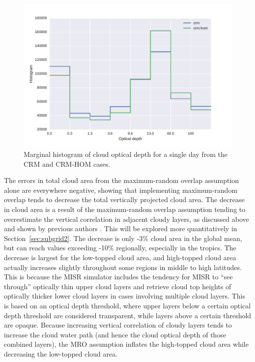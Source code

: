 \begin{figure}[htbp]
\centering
\includegraphics{graphics/taudist_hom.pdf}
\caption{\label{fig:subgrid1_cldtau_distribution}Marginal histogram of
cloud optical depth for a single day from the CRM and CRM-HOM
cases.}\label{fig:subgrid1ux5fcldtauux5fdistribution}
\end{figure}

The errors in total cloud area from the maximum-random overlap
assumption alone are everywhere negative, showing that implementing
maximum-random overlap tends to decrease the total vertically projected
cloud area. The decrease in cloud area is a result of the maximum-random
overlap assumption tending to overestimate the vertical correlation in
adjacent cloudy layers, as discussed above and shown by previous authors
\citep{mace_and_benson-troth_2002, hogan_and_illingworth_2000, barker_2008}.
This will be explored more quantitatively in Section~\ref{sec:subgrid2}.
The decrease is only -3\% cloud area in the global mean, but can reach
values exceeding -10\% regionally, especially in the tropics. The
decrease is largest for the low-topped cloud area, and high-topped cloud
area actually increases slightly throughout some regions in middle to
high latitudes. This is because the MISR simulator includes the tendency
for MISR to ``see through'' optically thin upper cloud layers and
retrieve cloud top heights of optically thicker lower cloud layers in
cases involving multiple cloud layers. This is based on an optical depth
threshold, where upper layers below a certain optical depth threshold
are considered transparent, while layers above a certain threshold are
opaque. Because increasing vertical correlation of cloudy layers tends
to increase the cloud water path (and hence the cloud optical depth of
those combined layers), the MRO assumption inflates the high-topped
cloud area while decreasing the low-topped cloud area.


